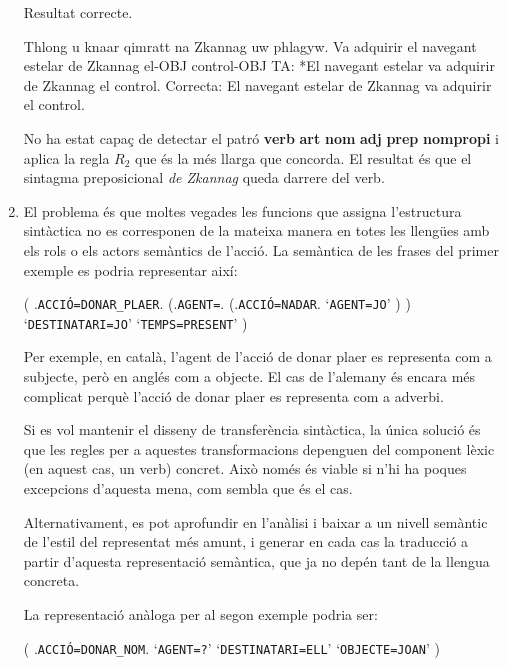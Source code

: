 \begin{enumerate}
     Resultat correcte.


     \begin{example}
     \gll Thlong u knaar qimratt na Zkannag uw phlagyw.
          {Va adquirir} el navegant estelar de Zkannag el-OBJ control-OBJ
     \glt TA: *El navegant estelar va adquirir de Zkannag el control.
     \glt Correcta: El navegant estelar de Zkannag va adquirir el control.
     \glend
     \end{example}

     No ha estat capaç de detectar el patró \textbf{verb} \textbf{art}
     \textbf{nom} \textbf{adj} \textbf{prep}
     \textbf{nompropi} i aplica la regla $R_2$ que és la més llarga
     que concorda. El resultat és que el sintagma preposicional
     \emph{de Zkannag} queda darrere del verb.

\item El problema és que moltes vegades les funcions que assigna
  l'estructura sintàctica no es corresponen de la mateixa manera en
  totes les llengües amb els rols o els actors semàntics
  de l'acció. La semàntica de les frases del primer exemple es podria representar
  així:

  \begin{parsetree}
    ( .{\texttt{ACCIÓ=DONAR\_PLAER}}.
      (.{\texttt{AGENT=}}.
        (.{\texttt{ACCIÓ=NADAR}}.
          `\texttt{AGENT=JO}' ) )
      `\texttt{DESTINATARI=JO}'
      `\texttt{TEMPS=PRESENT}' )
  \end{parsetree} 

  Per exemple, en català, l'agent de l'acció de donar plaer es
  representa com a subjecte, però en anglés com a objecte. El cas de
  l'alemany és encara més complicat perquè l'acció de donar plaer es
  representa com a adverbi.
  
  Si es vol mantenir el disseny de transferència sintàctica, la única
  solució és que les regles per a aquestes transformacions depenguen
  del component lèxic (en aquest cas, un verb) concret. Això només és
  viable si n'hi ha poques excepcions d'aquesta mena, com sembla que
  és el cas.
  
  Alternativament, es pot aprofundir en l'anàlisi i baixar a un nivell
  semàntic de l'estil del representat més amunt, i generar en cada cas
  la traducció a partir d'aquesta representació semàntica, que ja no
  depén tant de la llengua concreta.

  La representació anàloga per al segon exemple podria ser:

  \begin{parsetree}
    ( .{\texttt{ACCIÓ=DONAR\_NOM}}.
      `{\texttt{AGENT=?}}'
      `{\texttt{DESTINATARI=ELL}}'
      `{\texttt{OBJECTE=JOAN}}'
    )
  \end{parsetree}
    

\end{enumerate}
